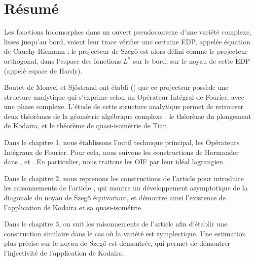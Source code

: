 

\begingroup
\let\clearpage\relax
\let\cleardoublepage\relax
\let\cleardoublepage\relax

\chapter*{Résumé}
	Les fonctions holomorphes dans un ouvert pseudoconvexe d'une variété complexe, lisses jusqu'au bord, voient leur trace vérifier une certaine EDP, appelée équation de Cauchy-Riemann ; le projecteur de Szeg\H{o} est alors  défini comme le projecteur orthogonal, dans l'espace des fonctions $L^2$ sur
	le bord, sur le noyau de cette EDP (appelé espace de Hardy).
	
	Boutet de Monvel et Sjöstrand ont établi (\cite{BoutetdeMonvel1975}) que ce projecteur possède une structure analytique qui s'exprime selon un Opérateur Intégral de Fourier, avec une phase complexe. L'étude de cette structure analytique permet de retrouver deux théorèmes de la géométrie algébrique complexe : le théorème du plongement de Kodaira, et le théorème de quasi-isométrie de Tian.
	
	Dans le chapitre 1, nous établissons l'outil technique principal, les Opérateurs Intégraux de Fourier. Pour cela, nous suivons les constructions de Hormander dans \cite{hormander2003analysis}, \cite{hormander2007} et \cite{hormander1985}. En particulier, nous traitons les OIF par leur idéal lagrangien.
	
	Dans le chapitre 2, nous reprenons les constructions de l'article \cite{BoutetdeMonvel1975} pour introduire les raisonnements de l'article \cite{Zelditch2000}, qui montre un développement asymptotique de la diagonale du noyau de Szeg\H{o} équivariant, et démontre ainsi l'existence de l'application de Kodaira et sa quasi-isométrie.
	
	Dans le chapitre 3, on suit les raisonnements de l'article \cite{Shiffman2002} afin d'établir une construction similaire dans le cas où la variété est symplectique. Une estimation plus précise sur le noyau de Szeg\H{o} est démontrée, qui permet de démontrer l'injectivité de l'application de Kodaira.
\endgroup			

\vfill
